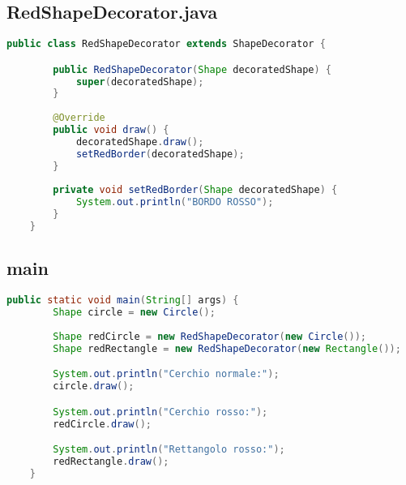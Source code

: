 \subsection{RedShapeDecorator.java}
\begin{lstlisting}[language=java]
    public class RedShapeDecorator extends ShapeDecorator {

        public RedShapeDecorator(Shape decoratedShape) {
            super(decoratedShape);
        }
        
        @Override
        public void draw() {
            decoratedShape.draw();
            setRedBorder(decoratedShape);
        }
    
        private void setRedBorder(Shape decoratedShape) {
            System.out.println("BORDO ROSSO");
        }
    }
\end{lstlisting}

\subsection{main}
\begin{lstlisting}[language=java]
    public static void main(String[] args) {
        Shape circle = new Circle();
        
        Shape redCircle = new RedShapeDecorator(new Circle());
        Shape redRectangle = new RedShapeDecorator(new Rectangle());

        System.out.println("Cerchio normale:");
        circle.draw();

        System.out.println("Cerchio rosso:");
        redCircle.draw();

        System.out.println("Rettangolo rosso:");
        redRectangle.draw();
    }
\end{lstlisting}